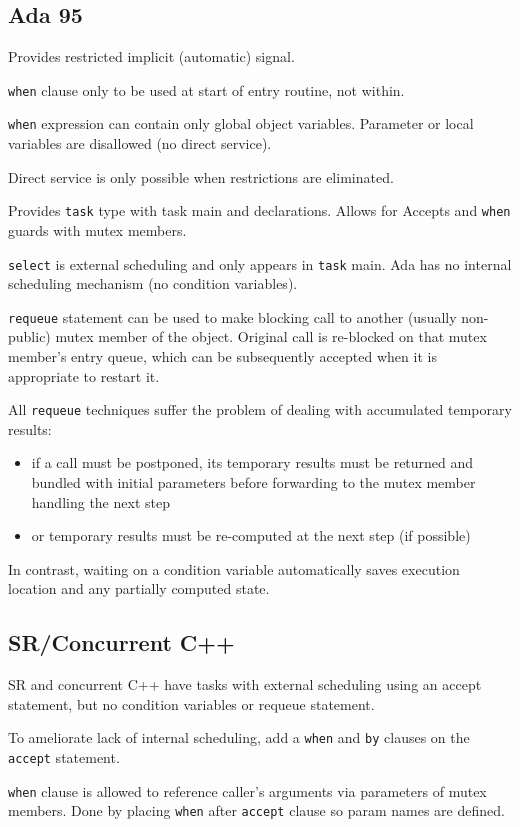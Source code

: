 \documentclass[11pt]{article}
\begin{document}
\subsection{Ada 95}
\label{sec:orgcae3fbd}
Provides restricted implicit (automatic) signal.

\texttt{when} clause only to be used at start of entry routine, not within.

\texttt{when} expression can contain only global object variables. Parameter or
local variables are disallowed (no direct service).

Direct service is only possible when restrictions are eliminated.

Provides \texttt{task} type with task main and declarations.
Allows for Accepts and \texttt{when} guards with mutex members.

\texttt{select} is external scheduling and only appears in \texttt{task} main.
Ada has no internal scheduling mechanism (no condition variables).

\texttt{requeue} statement can be used to make blocking call to another
(usually non-public) mutex member of the object.
Original call is re-blocked on that mutex member's entry queue,
which can be subsequently accepted when it is appropriate to restart
it.

All \texttt{requeue} techniques suffer the problem of dealing with
accumulated temporary results:
\begin{itemize}
\item if a call must be postponed, its temporary results must be returned
and bundled with initial parameters before forwarding to the mutex
member handling the next step
\item or temporary results must be re-computed at the next step (if
possible)
\end{itemize}

In contrast, waiting on a condition variable automatically saves
execution location and any partially computed state.
\subsection{SR/Concurrent C++}
\label{sec:orgfaaf259}
SR and concurrent C++ have tasks with external scheduling using an accept
statement, but no condition variables or requeue statement.

To ameliorate lack of internal scheduling, add a \texttt{when} and \texttt{by} clauses on
the \texttt{accept} statement.

\texttt{when} clause is allowed to reference caller's arguments via parameters of
mutex members.
Done by placing \texttt{when} after \texttt{accept} clause so param names are defined.
\end{document}
